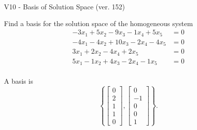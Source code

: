 \begin{exercise}
  \begin{exerciseTitle}V10 - Basis of Solution Space (ver. 152)\end{exerciseTitle}
  \begin{exerciseStatement}
    Find a basis for the solution space of the homogeneous system 
\begin{align*}
 -3 x_ 1 + 5 x_ 2 -9 x_ 3 -1 x_ 4 + 5 x_ 5 &= 0  \\ 
  -4 x_ 1 -4 x_ 2 + 10 x_ 3 -2 x_ 4 -4 x_ 5 &= 0  \\ 
  3 x_ 1 + 2 x_ 2 -4 x_ 4 + 2 x_ 5 &= 0  \\ 
  5 x_ 1 -1 x_ 2 + 4 x_ 3 -2 x_ 4 -1 x_ 5 &= 0  \\ 
 \end{align*}


 
  \end{exerciseStatement}

  \begin{exerciseAnswer}
   A basis is   
\[\left\{\left[\begin{array}{c}
0 \\
2 \\
1 \\
1 \\
0
\end{array}\right] , \left[\begin{array}{c}
0 \\
-1 \\
0 \\
0 \\
1
\end{array}\right]\right\}.\]

  


  \end{exerciseAnswer}
\end{exercise}
